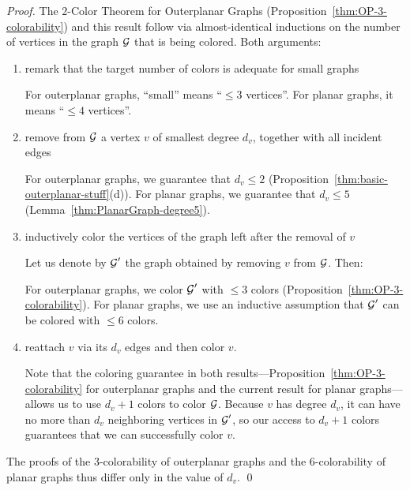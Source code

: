 \begin{proof}
The $2$-Color Theorem for Outerplanar Graphs (Proposition~\ref{thm:OP-3-colorability}) and this result follow via almost-identical inductions on the number of vertices in the graph $\mbox{$\cal G$}$ that is being colored.  Both arguments:
\begin{enumerate}
\item
remark that the target number of colors is adequate for small graphs

\smallskip

For outerplanar graphs, ``small'' means ``$\leq 3$ vertices''.  For planar graphs, it means ``$\leq 4$ vertices''.

\item
remove from $\mbox{$\cal G$}$ a vertex $v$ of smallest degree $d_v$, together with all incident edges

\smallskip

For outerplanar graphs, we guarantee that $d_v \leq 2$ (Proposition~\ref{thm:basic-outerplanar-stuff}(d)).  For planar graphs, we guarantee that $d_v \leq 5$ (Lemma~\ref{thm:PlanarGraph-degree5}).

\item
inductively color the vertices of the graph left after the removal of $v$

\smallskip

Let us denote by $\mbox{$\cal G$}'$ the graph obtained by removing $v$ from $\mbox{$\cal G$}$.  Then: 

For outerplanar graphs, we color $\mbox{$\cal G$}'$ with $\leq 3$ colors (Proposition~\ref{thm:OP-3-colorability}).  For planar graphs, we use an inductive assumption that $\mbox{$\cal G$}'$ can be colored with $\leq 6$ colors. 

\item
reattach $v$ via its $d_v$ edges and then color $v$.

\smallskip

Note that the coloring guarantee in both results---Proposition~\ref{thm:OP-3-colorability} for outerplanar graphs and the current result for planar graphs---allows us to use $d_v +1$ colors to color $\mbox{$\cal G$}$.  Because $v$ has degree $d_v$, it can have no more than $d_v$ neighboring vertices in $\mbox{$\cal G$}'$, so our access to $d_v +1$ colors guarantees that we can successfully color $v$.
\end{enumerate}
The proofs of the $3$-colorability of outerplanar graphs and the $6$-colorability of planar graphs thus differ only in the value of $d_v$.  \qed
\end{proof}


